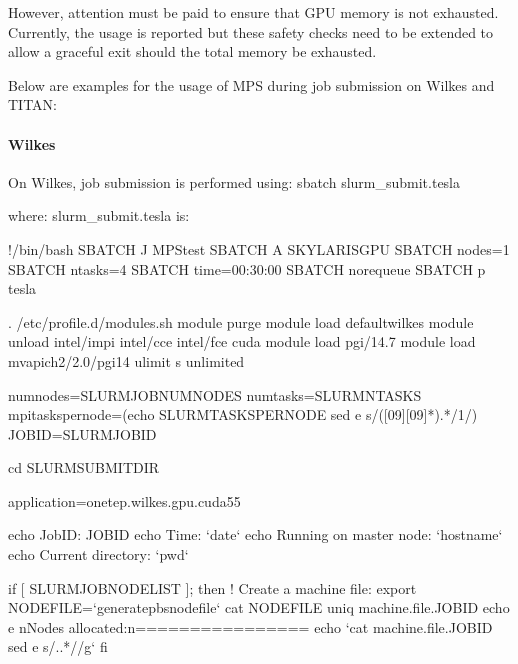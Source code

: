 \documentclass[letterpaper,10pt,english]{sphinxmanual}
\begin{document}
However, attention must be paid to ensure that GPU memory is not
exhausted. Currently, the usage is reported but these safety checks need
to be extended to allow a graceful exit should the total memory be
exhausted.

Below are examples for the usage of MPS during job submission on Wilkes
and TITAN:


\paragraph{Wilkes}
\label{\detokenize{ONETEP_OpenACC:wilkes}}
On Wilkes, job submission is performed using: sbatch slurm\_submit.tesla

where: slurm\_submit.tesla is:

%
\begin{sphinxVerbatim}[commandchars=\\\{\}]
\PYGZsh{}!/bin/bash
\PYGZsh{}SBATCH \PYGZhy{}J MPS\PYGZus{}test
\PYGZsh{}SBATCH \PYGZhy{}A SKYLARIS\PYGZhy{}GPU
\PYGZsh{}SBATCH \PYGZhy{}\PYGZhy{}nodes=1
\PYGZsh{}SBATCH \PYGZhy{}\PYGZhy{}ntasks=4
\PYGZsh{}SBATCH \PYGZhy{}\PYGZhy{}time=00:30:00
\PYGZsh{}SBATCH \PYGZhy{}\PYGZhy{}no\PYGZhy{}requeue
\PYGZsh{}SBATCH \PYGZhy{}p tesla

. /etc/profile.d/modules.sh
module purge
module load default\PYGZhy{}wilkes
module unload intel/impi intel/cce intel/fce cuda
module load pgi/14.7
module load mvapich2/2.0/pgi\PYGZhy{}14
ulimit \PYGZhy{}s unlimited

numnodes=\PYGZdl{}SLURM\PYGZus{}JOB\PYGZus{}NUM\PYGZus{}NODES
numtasks=\PYGZdl{}SLURM\PYGZus{}NTASKS
mpi\PYGZus{}tasks\PYGZus{}per\PYGZus{}node=\PYGZdl{}(echo \PYGZdq{}\PYGZdl{}SLURM\PYGZus{}TASKS\PYGZus{}PER\PYGZus{}NODE\PYGZdq{} \textbar{} sed \PYGZhy{}e  \PYGZsq{}s/\PYGZca{}\PYGZbs{}([0\PYGZhy{}9][0\PYGZhy{}9]*\PYGZbs{}).*\PYGZdl{}/\PYGZbs{}1/\PYGZsq{})
JOBID=\PYGZdl{}SLURM\PYGZus{}JOB\PYGZus{}ID

cd \PYGZdl{}SLURM\PYGZus{}SUBMIT\PYGZus{}DIR

application=\PYGZdq{}onetep.wilkes.gpu.cuda55\PYGZdq{}

echo \PYGZdq{}JobID: \PYGZdl{}JOBID\PYGZdq{}
echo \PYGZdq{}Time: {}`date{}`\PYGZdq{}
echo \PYGZdq{}Running on master node: {}`hostname{}`\PYGZdq{}
echo \PYGZdq{}Current directory: {}`pwd{}`\PYGZdq{}

if [ \PYGZdq{}\PYGZdl{}SLURM\PYGZus{}JOB\PYGZus{}NODELIST\PYGZdq{} ]; then
       \PYGZsh{}! Create a machine file:
       export NODEFILE={}`generate\PYGZus{}pbs\PYGZus{}nodefile{}`
       cat \PYGZdl{}NODEFILE \textbar{} uniq \PYGZgt{} machine.file.\PYGZdl{}JOBID
       echo \PYGZhy{}e \PYGZdq{}\PYGZbs{}nNodes allocated:\PYGZbs{}n================\PYGZdq{}
       echo {}`cat machine.file.\PYGZdl{}JOBID \textbar{} sed \PYGZhy{}e \PYGZsq{}s/\PYGZbs{}..*\PYGZdl{}//g\PYGZsq{}{}`
fi


\end{sphinxVerbatim}
\end{document}
